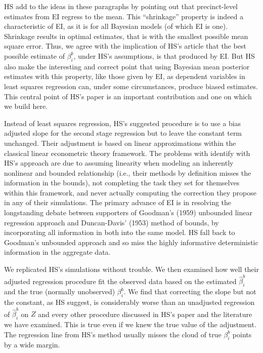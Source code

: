\documentclass[11pt,titlepage]{article}
\begin{document}
HS add to the ideas in these paragraphs by pointing out that
precinct-level estimates from EI regress to the mean.  This
``shrinkage'' property is indeed a characteristic of EI, as it is for
all Bayesian models (of which EI is one).  Shrinkage results in
optimal estimates, that is with the smallest possible mean square
error.  Thus, we agree with the implication of HS's article that the
best possible estimate of $\beta^b_i$, under HS's assumptions, is that
produced by EI.  But HS also make the interesting and correct point
that using Bayesian mean posterior estimates with this property, like
those given by EI, as dependent variables in least squares regression
can, under some circumstances, produce biased estimates.  This central
point of HS's paper is an important contribution and one on which we
build here.

Instead of least squares regression, HS's suggested procedure is to
use a bias adjusted slope for the second stage regression but to leave
the constant term unchanged.  Their adjustment is based on linear
approximations within the classical linear econometric theory
framework.  The problems with identify with HS's approach are due to
assuming linearity when modeling an inherently nonlinear and bounded
relationship (i.e., their methods by definition misses the information
in the bounds), not completing the task they set for themselves within
this framework, and never actually computing the correction they
propose in any of their simulations.  The primary advance of EI is in
resolving the longstanding debate between supporters of Goodman's
(1959) unbounded linear regression approach and Duncan-Davis' (1953)
method of bounds, by incorporating all information in both into the
same model.  HS fall back to Goodman's unbounded approach and so miss
the highly informative deterministic information in the aggregate
data.

We replicated HS's simulations without trouble.  We then examined how
well their adjusted regression procedure fit the observed data based
on the estimated $\hat\beta_i^b$ and the true (normally unobserved)
$\beta_i^b$.  We find that correcting the slope but not the constant,
as HS suggest, is considerably worse than an unadjusted regression of
$\hat\beta_i^b$ on $Z$ and every other procedure discussed in HS's
paper and the literature we have examined.  This is true even if we
knew the true value of the adjustment.  The regression line from HS's
method usually misses the cloud of true $\beta_i^b$ points by a wide
margin.
\end{document}
